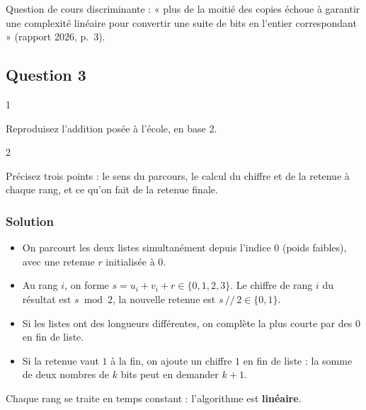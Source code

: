\documentclass[11pt,a4paper]{article}
\providecommand{\tightlist}{\setlength{\itemsep}{0pt}\setlength{\parskip}{0pt}}
\begin{document}
\begin{jury}

Question de cours discriminante : « plus de la moitié des copies échoue à garantir une complexité linéaire pour convertir une suite de bits en l'entier correspondant » (rapport 2026, p.~3).

\end{jury}

\hypertarget{question-3}{%
\subsection{Question 3}\label{question-3}}

\begin{indication}{1}

Reproduisez l'addition posée à l'école, en base 2.

\end{indication}

\begin{indication}{2}

Précisez trois points : le sens du parcours, le calcul du chiffre et de la retenue à chaque rang, et ce qu'on fait de la retenue finale.

\end{indication}

\hypertarget{solution-2}{%
\subsubsection{Solution}\label{solution-2}}

\begin{itemize}
\tightlist
\item
  On parcourt les deux listes simultanément depuis l'indice \(0\) (poids faibles), avec une retenue \(r\) initialisée à \(0\).
\item
  Au rang \(i\), on forme \(s = u_i + v_i + r \in \{0, 1, 2, 3\}\). Le chiffre de rang \(i\) du résultat est \(s \bmod 2\), la nouvelle retenue est \(s \,//\, 2 \in \{0,1\}\).
\item
  Si les listes ont des longueurs différentes, on complète la plus courte par des \(0\) en fin de liste.
\item
  Si la retenue vaut \(1\) à la fin, on ajoute un chiffre \(1\) en fin de liste : la somme de deux nombres de \(k\) bits peut en demander \(k+1\).
\end{itemize}

Chaque rang se traite en temps constant : l'algorithme est \textbf{linéaire}.
\end{document}
